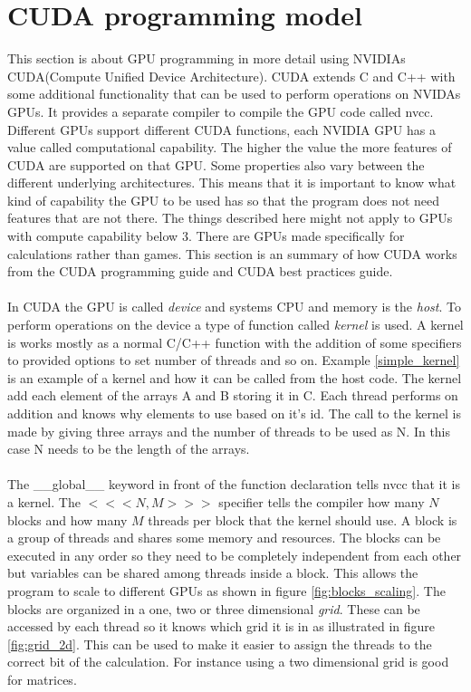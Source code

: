 \documentclass[10pt,a4paper]{report}
\newcounter{example}
\begin{document}
\section{CUDA programming model}
\label{cuda_programming_model}
This section is about GPU programming in more detail using NVIDIAs CUDA(Compute Unified Device Architecture)\cite{cuda}. CUDA extends C and C++ with some additional functionality that can be used to perform operations on NVIDAs GPUs. It provides a separate compiler to compile the GPU code called nvcc\cite{cuda}. Different GPUs support different CUDA functions, each NVIDIA GPU has a value called computational capability. The higher the value the more features of CUDA are supported on that GPU. Some properties also vary between the different underlying architectures. This means that it is important to know what kind of capability the GPU to be used has so that the program does not need features that are not there. The things described here might not apply to GPUs with compute capability below 3. There are GPUs made specifically for calculations rather than games. This section is an summary of how CUDA works from the CUDA programming guide\cite{cuda} and CUDA best practices guide\cite{cuda_best_practice}.\\
\\
In CUDA the GPU is called \emph{device} and systems CPU and memory is the \emph{host}. To perform operations on the device a type of function called \emph{kernel} is used. A kernel is works mostly as a normal C/C++ function with the addition of some specifiers to provided options to set number of threads and so on. Example \ref{simple_kernel} is an example of a kernel and how it can be called from the host code. The kernel add each element of the arrays A and B storing it in C. Each thread performs on addition and knows why elements to use based on it's id. The call to the kernel is made by giving three arrays and the number of threads to be used as N. In this case N needs to be the length of the arrays.\\
\\
The \_\_global\_\_ keyword in front of the function declaration tells nvcc that it is a kernel. The $<<<N,M>>>$ specifier tells the compiler how many $N$ blocks and how many $M$ threads per block that the kernel should use\cite{cuda}. A block is a group of threads and shares some memory and resources. The blocks can be executed in any order so they need to be completely independent from each other but variables can be shared among threads inside a block\cite{cuda}. This allows the program to scale to different GPUs as shown in figure \ref{fig:blocks_scaling}. The blocks are  organized in a one, two or three dimensional \emph{grid}. These can be accessed by each thread so it knows which grid it is in as illustrated in figure \ref{fig:grid_2d}. This can be used to make it easier to assign the threads to the correct bit of the calculation. For instance using a two dimensional grid is good for matrices\cite{cuda, cuda_best_practice}.
\end{document}
